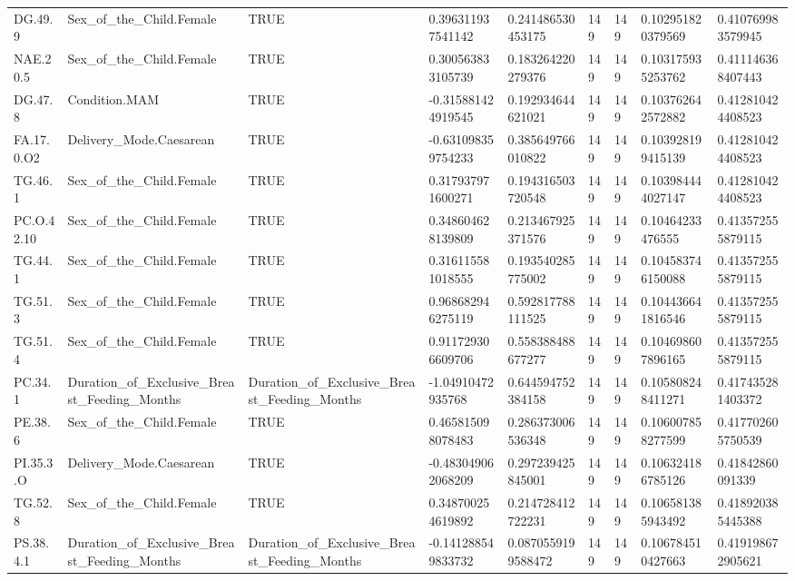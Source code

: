 \begin{longtable}{lllllllll}
DG.49.9 & Sex\_of\_the\_Child.Female & TRUE & 0.396311937541142 & 0.241486530453175 & 149 & 149 & 0.102951820379569 & 0.410769983579945 \\
NAE.20.5 & Sex\_of\_the\_Child.Female & TRUE & 0.300563833105739 & 0.183264220279376 & 149 & 149 & 0.103175935253762 & 0.411146368407443 \\
DG.47.8 & Condition.MAM & TRUE & -0.315881424919545 & 0.192934644621021 & 149 & 149 & 0.103762642572882 & 0.412810424408523 \\
FA.17.0.O2 & Delivery\_Mode.Caesarean & TRUE & -0.631098359754233 & 0.385649766010822 & 149 & 149 & 0.103928199415139 & 0.412810424408523 \\
TG.46.1 & Sex\_of\_the\_Child.Female & TRUE & 0.317937971600271 & 0.194316503720548 & 149 & 149 & 0.103984444027147 & 0.412810424408523 \\
PC.O.42.10 & Sex\_of\_the\_Child.Female & TRUE & 0.348604628139809 & 0.213467925371576 & 149 & 149 & 0.10464233476555 & 0.413572555879115 \\
TG.44.1 & Sex\_of\_the\_Child.Female & TRUE & 0.316115581018555 & 0.193540285775002 & 149 & 149 & 0.104583746150088 & 0.413572555879115 \\
TG.51.3 & Sex\_of\_the\_Child.Female & TRUE & 0.968682946275119 & 0.592817788111525 & 149 & 149 & 0.104436641816546 & 0.413572555879115 \\
TG.51.4 & Sex\_of\_the\_Child.Female & TRUE & 0.911729306609706 & 0.558388488677277 & 149 & 149 & 0.104698607896165 & 0.413572555879115 \\
PC.34.1 & Duration\_of\_Exclusive\_Breast\_Feeding\_Months & Duration\_of\_Exclusive\_Breast\_Feeding\_Months & -1.04910472935768 & 0.644594752384158 & 149 & 149 & 0.105808248411271 & 0.417435281403372 \\
PE.38.6 & Sex\_of\_the\_Child.Female & TRUE & 0.465815098078483 & 0.286373006536348 & 149 & 149 & 0.106007858277599 & 0.417702605750539 \\
PI.35.3.O & Delivery\_Mode.Caesarean & TRUE & -0.483049062068209 & 0.297239425845001 & 149 & 149 & 0.106324186785126 & 0.41842860091339 \\
TG.52.8 & Sex\_of\_the\_Child.Female & TRUE & 0.348700254619892 & 0.214728412722231 & 149 & 149 & 0.106581385943492 & 0.418920385445388 \\
PS.38.4.1 & Duration\_of\_Exclusive\_Breast\_Feeding\_Months & Duration\_of\_Exclusive\_Breast\_Feeding\_Months & -0.141288549833732 & 0.0870559199588472 & 149 & 149 & 0.106784510427663 & 0.419198672905621 \\

\end{longtable}
